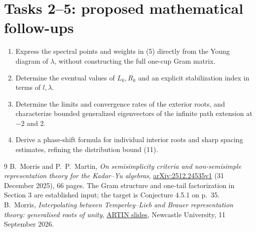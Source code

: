 \documentclass[11pt]{article}
\begin{document}
\section*{Tasks 2--5: proposed mathematical follow-ups}
\begin{enumerate}[label=\textbf{Task \arabic*:},start=2,leftmargin=*]
\item Express the spectral points and weights in (5) directly
from the Young diagram of \(\lambda\), without constructing the
full one-cup Gram matrix.
\item Determine the eventual values of \(L_k,R_k\) and an
explicit stabilization index in terms of \(l,\lambda\).
\item Determine the limits and convergence rates of the exterior
roots, and characterize bounded generalized eigenvectors of the
infinite path extension at \(-2\) and \(2\).
\item Derive a phase-shift formula for individual interior roots
and sharp spacing estimates, refining the distribution bound (11).
\end{enumerate}

\begin{thebibliography}{9}
B.~Morris and P.~P.~Martin,
\emph{On semisimplicity criteria and non-semisimple representation
theory for the Kadar--Yu algebras},
\href{https://arxiv.org/abs/2512.24535}{arXiv:2512.24535v1}
(31 December 2025), 66 pages.
The Gram structure and one-tail factorization in Section 3
are established input; the target is Conjecture 4.5.1 on p.~35.
B.~Morris, \emph{Interpolating between Temperley--Lieb and Brauer
representation theory: generalised roots of unity},
\href{https://drive.google.com/file/d/1awcjFlsm4D7ApgIJ7WjTw_CcWoHwmTMp/view}
{ARTIN slides}, Newcastle University, 11 September 2026.
\end{thebibliography}
\end{document}
